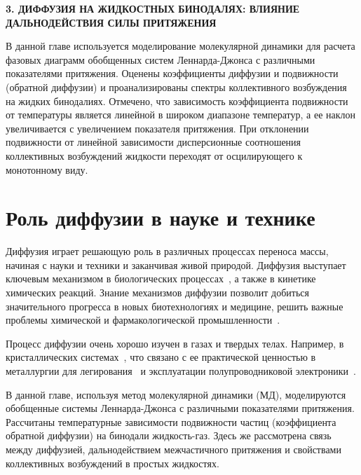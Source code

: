\newpage
\begin{center}
  \textbf{\large 3. ДИФФУЗИЯ НА ЖИДКОСТНЫХ БИНОДАЛЯХ: ВЛИЯНИЕ ДАЛЬНОДЕЙСТВИЯ СИЛЫ ПРИТЯЖЕНИЯ}
\end{center}


В данной главе используется моделирование молекулярной динамики для расчета фазовых диаграмм обобщенных систем Леннарда-Джонса с различными показателями притяжения.
Оценены коэффициенты диффузии и подвижности (обратной диффузии) и проанализированы спектры коллективного возбуждения на жидких бинодалиях. 
Отмечено, что зависимость коэффициента подвижности от температуры является линейной в широком диапазоне температур, а ее наклон увеличивается с увеличением показателя притяжения.
При отклонении подвижности от линейной зависимости дисперсионные соотношения коллективных возбуждений жидкости переходят от осцилирующего к монотонному виду.

\section{Роль диффузии в науке и технике}
\label{MACR-SecIntroduction}

Диффузия играет решающую роль в различных процессах переноса массы, начиная с науки и техники и заканчивая живой природой.
Диффузия выступает ключевым механизмом в биологических процессах~\cite{10.1016/j.bbagen.2013.09.037, 10.1038/s41598-018-22643-9}, а также в кинетике химических реакций.
Знание механизмов диффузии позволит добиться значительного прогресса в новых биотехнологиях и медицине, решить важные проблемы химической и фармакологической промышленности~\cite{10.1002/3527602836}.

Процесс диффузии очень хорошо изучен в газах и твердых телах.
Например, в кристаллических системах~\cite{10.1016/0079-6816(95)00039-2}, что связано с ее практической ценностью в металлургии для легирования~\cite{10.1016/s0924-0136(96)02826-9, 10.1016/j.actamat.2015.10.010, 10.1134/s1063783411110308} и эксплуатации полупроводниковой электроники~\cite{10.1103/physrevlett.84.4220, 10.1016/j.physrep.2009.10.003}.

В данной главе, используя метод молекулярной динамики (МД), моделируются обобщенные системы Леннарда-Джонса с различными показателями притяжения.
Рассчитаны температурные зависимости подвижности частиц (коэффициента обратной диффузии) на бинодали жидкость-газ. 
Здесь же рассмотрена связь между диффузией, дальнодействием межчастичного притяжения и свойствами коллективных возбуждений в простых жидкостях.

